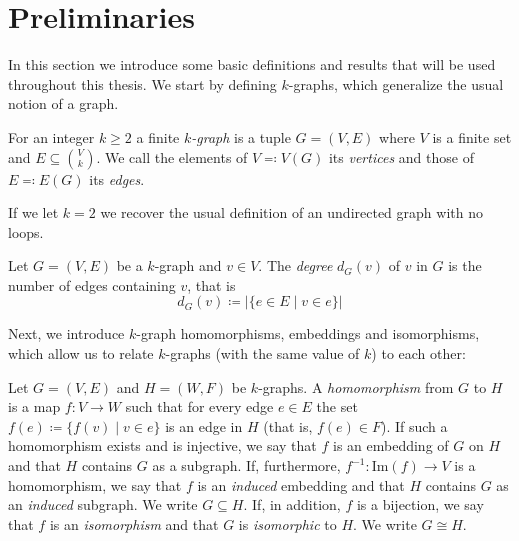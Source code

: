 \section{Preliminaries}\label{sec:preliminaries}
In this section we introduce some basic definitions and results that will be used throughout this thesis.
We start by defining $k$-graphs, which generalize the usual notion of a graph.

\begin{definition}

    For an integer $k \geq 2$ a finite \emph{$k$-graph}
    is a tuple $G = (V, E)$ where $V$ is a finite set
    and $E \subseteq \binom{V}{k}$.
    We call the elements of $V \eqqcolon V(G)$ its \emph{vertices}
    and those of $E \eqqcolon E(G)$ its \emph{edges}.
\end{definition}

\begin{remark}
    If we let $k=2$ we recover the usual definition of an undirected graph with no loops.
\end{remark}

\begin{definition}
    Let $G = (V, E)$ be a $k$-graph and $v \in V$.
    The \emph{degree} $d_G(v)$ of $v$ in $G$
    is the number of edges containing $v$, that is
    \[
        d_G(v) \coloneqq |\{e \in E \mid v \in e\}|
    \]
\end{definition}

Next, we introduce $k$-graph homomorphisms, embeddings and isomorphisms, which allow us
to relate $k$-graphs (with the same value of $k$) to each other:

\begin{definition}
    Let $G = (V, E)$ and $H = (W, F)$ be $k$-graphs.
    A \emph{homomorphism} from $G$ to $H$ is a map $f: V \to W$
    such that for every edge $e \in E$ the set $f(e) \coloneqq \{f(v) \mid v \in e\}$
    is an edge in $H$ (that is, $f(e) \in F$). If such a homomorphism exists
    and is injective, we say that $f$ is an embedding of $G$ on $H$
    and that $H$ contains $G$ as a subgraph.
    If, furthermore, $f^{-1}: \text{Im}(f) \to V$ is a homomorphism, we say that $f$
    is an \emph{induced} embedding and that $H$ contains $G$ as an \emph{induced}
    subgraph.
    We write $G \subseteq H$.
    If, in addition, $f$ is a bijection, we say that $f$ is an \emph{isomorphism}
    and that $G$ is \emph{isomorphic} to $H$.
    We write $G \cong H$.
\end{definition}


